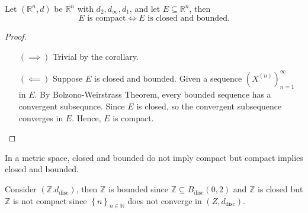 \begin{theorem}
    Let \(\left( \mathbb{R} ^n, d \right) \) be \(\mathbb{R} ^n\) with \(d_2, d_\infty , d_1\), and let \(E \subseteq \mathbb{R} ^n\), then 
    \[
        E \text{ is compact} \iff E \text{ is closed and bounded}.
    \]  
\end{theorem}
\begin{proof}
    \vphantom{text}
    \begin{itemize}
        \item [\((\implies )\)] Trivial by the corollary. 
        \item [\((\impliedby )\)] Suppose \(E\) is closed and bounded. Given a sequence \(\left( X^{(n)} \right)_{n=1}^{\infty}  \) in \(E\). By Bolzono-Weirstrass Theorem, every bounded sequence has a convergent subsequnce. Since \(E\) is closed, so the convergent subsequence converges in \(E\). Hence, \(E\) is compact.   
    \end{itemize}
\end{proof}

\begin{remark}
    In a metric space, closed and bounded do not imply compact but compact implies closed and bounded.
\end{remark}

\begin{eg}
    Consider \(\left( \mathbb{Z} . d_{\text{disc}} \right) \), then \(\mathbb{Z} \) is bounded since \(\mathbb{Z} \subseteq B_{\text{disc}}(0, 2)\) and \(\mathbb{Z} \) is closed but \(\mathbb{Z} \) is not compact since \(\left\{ n \right\}_{n \in \mathbb{N} } \) does not converge in \(\left( Z, d_{\text{disc}} \right) \). 
\end{eg}

